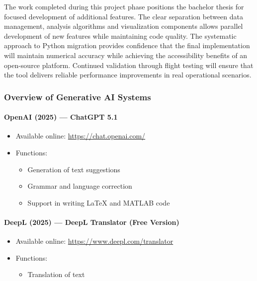 \documentclass[a4paper,11pt]{scrartcl}
\begin{document}
The work completed during this project phase positions the bachelor thesis for focused development of additional features. The clear separation between data management, analysis algorithms and visualization components allows parallel development of new features while maintaining code quality. The systematic approach to Python migration provides confidence that the final implementation will maintain numerical accuracy while achieving the accessibility benefits of an open-source platform. Continued validation through flight testing will ensure that the tool delivers reliable performance improvements in real operational scenarios.

\clearpage
\nocite{*}
\printbibliography[title={References}]

\clearpage

\subsubsection*{Overview of Generative AI Systems}

\paragraph{OpenAI (2025) — ChatGPT 5.1}
\begin{itemize}
	\item Available online:
	      \href{https://chat.openai.com/}{https://chat.openai.com/}
	\item Functions:
	      \begin{itemize}
		      \item Generation of text suggestions
		      \item Grammar and language correction
		      \item Support in writing LaTeX and MATLAB code
	      \end{itemize}
\end{itemize}

\paragraph{DeepL (2025) — DeepL Translator (Free Version)}
\begin{itemize}
	\item Available online:
	      \href{https://www.deepl.com/translator}{https://www.deepl.com/translator}
	\item Functions:
	      \begin{itemize}
		      \item Translation of text
	      \end{itemize}
\end{itemize}
\end{document}

